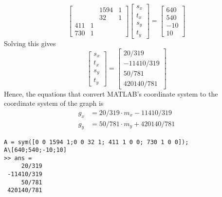 \documentclass[a4paper]{article}
\begin{document}
\begin{equation}
	\begin{bmatrix}
		 & & 1594 & 1\\
		 & & 32 & 1\\
		 411 & 1 & &\\
		 730 & 1 & &
	\end{bmatrix}
	\begin{bmatrix}
		s_x\\t_x\\s_y\\t_y
	\end{bmatrix}
	=
	\begin{bmatrix}
		640\\540\\-10\\10
	\end{bmatrix}
\end{equation}
Solving this gives 
\begin{equation}
	\begin{bmatrix}
		s_x\\t_x\\s_y\\t_y
	\end{bmatrix}
	=
	\begin{bmatrix}
		20/319\\-11410/319\\50/781\\420140/781
	\end{bmatrix}
\end{equation}
Hence, the equations that convert MATLAB's coordinate system to the coordinate system of the graph is
\begin{equation}
	\begin{aligned}
		g_x &=  20/319 \cdot m_x - 11410/319\\
		g_y &=  50/781 \cdot m_y + 420140/781
	\end{aligned}
\end{equation}{\label{eq:conversion}}
\begin{verbatim}
A = sym([0 0 1594 1;0 0 32 1; 411 1 0 0; 730 1 0 0]);
A\[640;540;-10;10]
>> ans =
     20/319
 -11410/319
     50/781
 420140/781
\end{verbatim}
\begin{comment}
	>> A = sym([0 0 1594 1;0 0 32 1; 411 1 0 0; 730 1 0 0])
	 
	A =
	 
	[   0, 0, 1594, 1]
	[   0, 0,   32, 1]
	[ 411, 1,    0, 0]
	[ 730, 1,    0, 0]
	 
	>> B = inv(A)
	 
	B =
	 
	[       0,       0,  -1/319,    1/319]
	[       0,       0, 730/319, -411/319]
	[  1/1562, -1/1562,       0,        0]
	[ -16/781, 797/781,       0,        0]
	 
	>> B*[640;540;-10;10]
	 
	ans =
	 
	     20/319
	 -11410/319
	     50/781
	 420140/781
\end{comment}
\end{document}
